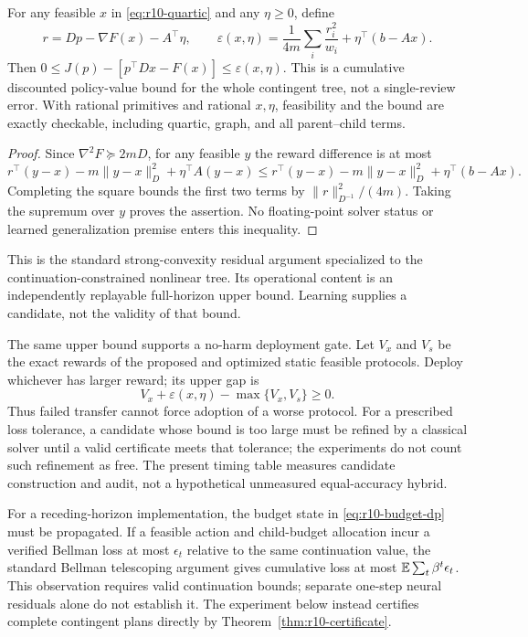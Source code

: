 \begin{theorem}\label{thm:r10-certificate}
For any feasible $x$ in \eqref{eq:r10-quartic} and any $\eta\geq0$, define
\[
 r=Dp-\nabla F(x)-A^\top\eta,\qquad
 \varepsilon(x,\eta)=\frac{1}{4m}\sum_i\frac{r_i^2}{w_i}
                         +\eta^\top(b-Ax).
\]
Then $0\leq J(p)-[p^\top Dx-F(x)]\leq\varepsilon(x,\eta)$. This is a cumulative discounted policy-value bound for the whole contingent tree, not a single-review error. With rational primitives and rational $x,\eta$, feasibility and the bound are exactly checkable, including quartic, graph, and all parent--child terms.
\end{theorem}
\begin{proof}
Since $\nabla^2F\succeq2mD$, for any feasible $y$ the reward difference is at most
\[
 r^\top(y-x)-m\|y-x\|_D^2+\eta^\top A(y-x)
 \leq r^\top(y-x)-m\|y-x\|_D^2+\eta^\top(b-Ax).
\]
Completing the square bounds the first two terms by $\|r\|_{D^{-1}}^2/(4m)$. Taking the supremum over $y$ proves the assertion. No floating-point solver status or learned generalization premise enters this inequality.
\end{proof}
This is the standard strong-convexity residual argument \citep{BoydVandenberghe2004} specialized to the continuation-constrained nonlinear tree. Its operational content is an independently replayable full-horizon upper bound. Learning supplies a candidate, not the validity of that bound.

The same upper bound supports a no-harm deployment gate. Let $V_x$ and $V_s$ be the exact rewards of the proposed and optimized static feasible protocols. Deploy whichever has larger reward; its upper gap is
\begin{equation}\label{eq:r10-gate}
 V_x+\varepsilon(x,\eta)-\max\{V_x,V_s\}\geq0.
\end{equation}
Thus failed transfer cannot force adoption of a worse protocol. For a prescribed loss tolerance, a candidate whose bound is too large must be refined by a classical solver until a valid certificate meets that tolerance; the experiments do not count such refinement as free. The present timing table measures candidate construction and audit, not a hypothetical unmeasured equal-accuracy hybrid.

For a receding-horizon implementation, the budget state in \eqref{eq:r10-budget-dp} must be propagated. If a feasible action and child-budget allocation incur a verified Bellman loss at most $\epsilon_t$ relative to the same continuation value, the standard Bellman telescoping argument gives cumulative loss at most $\mathbb E\sum_t\beta^t\epsilon_t$. This observation requires valid continuation bounds; separate one-step neural residuals alone do not establish it. The experiment below instead certifies complete contingent plans directly by Theorem~\ref{thm:r10-certificate}.

